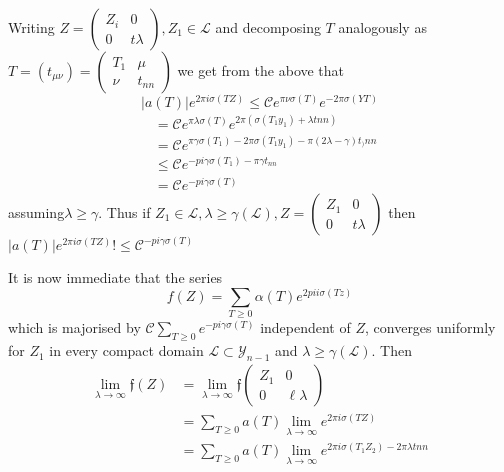Writing $Z = \begin{pmatrix} Z_i &0 \\ 0& t \lambda \end{pmatrix}, Z_1
\in \mathcal{L}$ \qquad and decomposing $T$ analogously as $T=(t_{\mu
  \nu})= \begin{pmatrix} T_1 &\mu \\ \nu & t_{nn}\end{pmatrix}$ we get
from the above that 
 $$
 |a(T)|e^{2\pi i \sigma (TZ)}\le \mathscr{C} e^{\pi\nu\sigma (T)}
 e^{-2 \pi \sigma (YT)}  
 $$
  \begin{align*} 
&=\mathscr{C}e^{\pi \lambda \sigma (T)} e^{2 \pi ( \sigma
      (T_1y_1)+\lambda tnn)}\\ 
&=\mathscr{C}e^{\pi \gamma \sigma (T_1)-2 \pi \sigma (T_1y_1)-\pi (2
      \lambda -\gamma)t_){nn}}\\ 
& \le \mathscr{C}e^{-pi \gamma \sigma(T_1)-\pi \gamma t_{nn}}\\ 
&=\mathscr{C}e^{-pi \gamma \sigma (T)}
 \end{align*} 
 assuming\pageoriginale $\lambda \ge \gamma$. Thus if $Z_1 \in
 \mathcal{L}, \lambda 
 \ge \gamma (\mathcal{L}),Z= \begin{pmatrix}Z_1 &0 \\ 0& t
   \lambda \end{pmatrix}$ then $|a(T)|e^{2 \pi i \sigma (TZ)}!\le
 \mathscr{C}^{-pi \gamma \sigma (T)}$ 
 
 It is now immediate that the series 
 $$
 f(Z)= \sum_{T \ge 0} \alpha (T)e^{2 pi i \sigma (Tz)}
 $$
  which is majorised by $\mathscr{C}\sum _{T \ge 0} e^{-pi \gamma
    \sigma(T)}$ independent of $Z$, converges uniformly for $Z_1$ in
  every compact domain $\mathcal{L}\subset\mathscr{Y}_{n-1}$ and $\lambda
  \ge \gamma (\mathcal{L})$. Then 
  \begin{align*}
\lim_{\lambda \to \infty} \mathfrak{f}(Z) & = \lim_{\lambda \to \infty}
\mathfrak{f}\begin{pmatrix} Z_1 &0 \\ 0& \ell \lambda \end{pmatrix}\\ 
& = \sum_{T \geq 0} a(T) \lim_{\lambda \to \infty}  e^{2 \pi i \sigma
  (TZ)}\\ 
& = \sum_{T \geq 0} a(T) \lim_{\lambda \to \infty}  e^{2 \pi i \sigma
  (T_1Z_2) - 2 \pi \lambda t n n} 
\end{align*}

